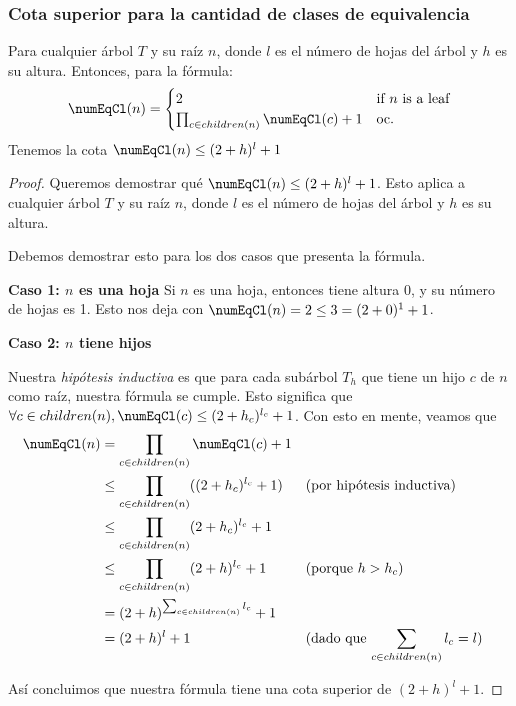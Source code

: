 \subsubsection{Cota superior para la cantidad de clases de equivalencia} \label{subsubSection:proofUpperBoundEquivalenceClasses}

\begin{lemma}
    Para cualquier árbol $T$ y su raíz $n$, donde $l$ es el número de hojas del árbol y $h$ es su altura. Entonces, para la fórmula: 
    \[
    \numEqCl(n) = 
    \begin{cases} 
    2 & \text{if $n$ is a leaf} \\
    \prod_{c \in children(n)} \numEqCl(c) + 1 & \text{oc.}
    \end{cases}
    \]
    Tenemos la cota $\numEqCl(n) \leq (2+h)^l + 1$
      
\end{lemma}

\begin{proof}
    Queremos demostrar qué $\numEqCl(n) \leq (2+h)^l + 1$. Esto aplica a cualquier árbol $T$ y su raíz $n$, donde $l$ es el número de hojas del árbol y $h$ es su altura.

    Debemos demostrar esto para los dos casos que presenta la fórmula.

    \textbf{Caso 1: $n$ es una hoja}
    Si $n$ es una hoja, entonces tiene altura 0, y su número de hojas es 1. Esto nos deja con $\numEqCl(n) = 2 \leq  3 = (2+0)^1 + 1$. 

    \textbf{Caso 2: $n$ tiene hijos}

    Nuestra \textit{hipótesis inductiva} es que para cada subárbol $T_h$ que tiene un hijo $c$ de $n$ como raíz, nuestra fórmula se cumple. Esto significa que $\forall c \in children(n), \numEqCl(c) \leq (2+ h_c)^{l_c} + 1$. Con esto en mente, veamos que
\begin{align*}
    \numEqCl(n)  
        &= \prod_{c \in children(n)} \numEqCl(c) + 1 \\
        &\leq \prod_{c \in children(n)} ((2+ h_c)^{l_c} + 1) 
            && \text{(por hipótesis inductiva)} \\
        &\leq \prod_{c \in children(n)} (2+ h_c)^{l_c} + 1 \\
        &\leq \prod_{c \in children(n)} (2+ h)^{l_c} + 1 
            && \text{(porque $h > h_c$)} \\
        &= (2+ h)^{\sum_{c \in children(n)} l_c} + 1 \\
        &= (2+ h)^l + 1 
            && \text{(dado que $\sum_{c \in children(n)} l_c = l$)} \\
\end{align*}



    Así concluimos que nuestra fórmula tiene una cota superior de $(2+ h)^l + 1$. 
\end{proof}

